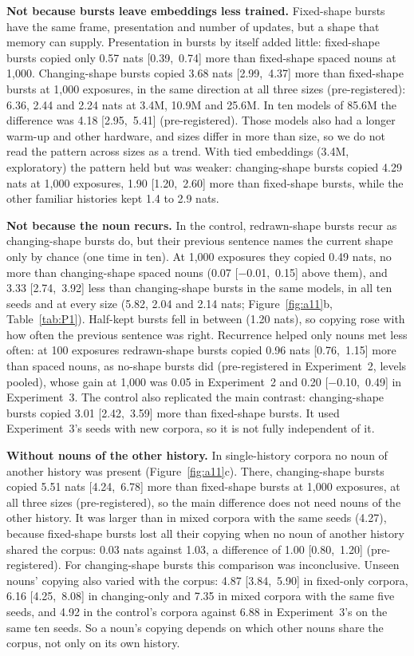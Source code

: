 \documentclass[11pt]{article}
\begin{document}
\textbf{Not because bursts leave embeddings less trained.} Fixed-shape bursts have the same frame, presentation and number of updates, but a shape that memory can supply. Presentation in bursts by itself added little: fixed-shape bursts copied only 0.57 nats [0.39,~0.74] more than fixed-shape spaced nouns at 1,000. Changing-shape bursts copied 3.68 nats [2.99,~4.37] more than fixed-shape bursts at 1,000 exposures, in the same direction at all three sizes (pre-registered): 6.36, 2.44 and 2.24 nats at 3.4M, 10.9M and 25.6M. In ten models of 85.6M the difference was 4.18 [2.95,~5.41] (pre-registered). Those models also had a longer warm-up and other hardware, and sizes differ in more than size, so we do not read the pattern across sizes as a trend. With tied embeddings (3.4M, exploratory) the pattern held but was weaker: changing-shape bursts copied 4.29 nats at 1,000 exposures, 1.90 [1.20,~2.60] more than fixed-shape bursts, while the other familiar histories kept 1.4 to 2.9 nats.

\textbf{Not because the noun recurs.} In the control, redrawn-shape bursts recur as changing-shape bursts do, but their previous sentence names the current shape only by chance (one time in ten). At 1,000 exposures they copied 0.49 nats, no more than changing-shape spaced nouns (0.07 [$-$0.01,~0.15] above them), and 3.33 [2.74,~3.92] less than changing-shape bursts in the same models, in all ten seeds and at every size (5.82, 2.04 and 2.14 nats; Figure~\ref{fig:a11}b, Table~\ref{tab:P1}). Half-kept bursts fell in between (1.20 nats), so copying rose with how often the previous sentence was right. Recurrence helped only nouns met less often: at 100 exposures redrawn-shape bursts copied 0.96 nats [0.76,~1.15] more than spaced nouns, as no-shape bursts did (pre-registered in Experiment~2, levels pooled), whose gain at 1,000 was 0.05 in Experiment~2 and 0.20 [$-$0.10,~0.49] in Experiment~3. The control also replicated the main contrast: changing-shape bursts copied 3.01 [2.42,~3.59] more than fixed-shape bursts. It used Experiment~3's seeds with new corpora, so it is not fully independent of it.

\textbf{Without nouns of the other history.} In single-history corpora no noun of another history was present (Figure~\ref{fig:a11}c). There, changing-shape bursts copied 5.51 nats [4.24,~6.78] more than fixed-shape bursts at 1,000 exposures, at all three sizes (pre-registered), so the main difference does not need nouns of the other history. It was larger than in mixed corpora with the same seeds (4.27), because fixed-shape bursts lost all their copying when no noun of another history shared the corpus: 0.03 nats against 1.03, a difference of 1.00 [0.80,~1.20] (pre-registered). For changing-shape bursts this comparison was inconclusive. Unseen nouns' copying also varied with the corpus: 4.87 [3.84,~5.90] in fixed-only corpora, 6.16 [4.25,~8.08] in changing-only and 7.35 in mixed corpora with the same five seeds, and 4.92 in the control's corpora against 6.88 in Experiment~3's on the same ten seeds. So a noun's copying depends on which other nouns share the corpus, not only on its own history.
\end{document}
